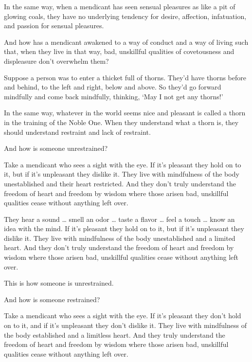 \documentclass[12pt,openany]{book}%
\begin{document}
In the same way, when a mendicant has seen sensual pleasures as like a pit of glowing coals, they have no underlying tendency for desire, affection, infatuation, and passion for sensual pleasures. 

And how has a mendicant awakened to a way of conduct and a way of living such that, when they live in that way, bad, unskillful qualities of covetousness and displeasure don’t overwhelm them? 

Suppose a person was to enter a thicket full of thorns. They’d have thorns before and behind, to the left and right, below and above. So they’d go forward mindfully and come back mindfully, thinking, ‘May I not get any thorns!’ 

In the same way, whatever in the world seems nice and pleasant is called a thorn in the training of the Noble One. When they understand what a thorn is, they should understand restraint and lack of restraint. 

And how is someone unrestrained? 

Take a mendicant who sees a sight with the eye. If it’s pleasant they hold on to it, but if it’s unpleasant they dislike it. They live with mindfulness of the body unestablished and their heart restricted. And they don’t truly understand the freedom of heart and freedom by wisdom where those arisen bad, unskillful qualities cease without anything left over. 

They hear a sound … smell an odor … taste a flavor … feel a touch … know an idea with the mind. If it’s pleasant they hold on to it, but if it’s unpleasant they dislike it. They live with mindfulness of the body unestablished and a limited heart. And they don’t truly understand the freedom of heart and freedom by wisdom where those arisen bad, unskillful qualities cease without anything left over. 

This is how someone is unrestrained. 

And how is someone restrained? 

Take a mendicant who sees a sight with the eye. If it’s pleasant they don’t hold on to it, and if it’s unpleasant they don’t dislike it. They live with mindfulness of the body established and a limitless heart. And they truly understand the freedom of heart and freedom by wisdom where those arisen bad, unskillful qualities cease without anything left over. 
\end{document}
